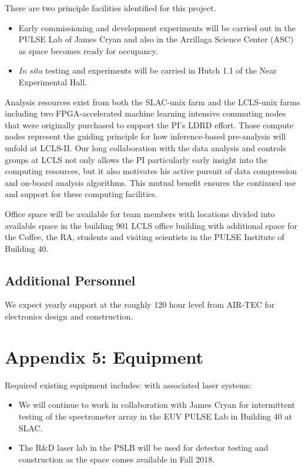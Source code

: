 There are two principle facilities identified for this project.
\begin{itemize}
\item Early commissioning and development experiments will be carried out in the PULSE Lab of James Cryan and also in the Arrillaga Science Center (ASC) as space becomes ready for occupancy.
\item \textit{In situ} testing and experiments will be carried in Hutch 1.1 of the Near Experimental Hall.
\end{itemize}

Analysis resources exist from both the SLAC-unix farm and the LCLS-unix farms including two FPGA-accelerated machine learning intensive commuting nodes that were originally purchased to support the PI's LDRD effort.  
Those compute nodes represent the guiding principle for how inference-based pre-analysis will unfold at LCLS-II.
Our long collaboration with the data analysis and controls groups at LCLS not only allows the PI particularly early insight into the computing resources, but it also motivates his active pursuit of data compression and on-board analysis algorithms.
This mutual benefit ensures the continued use and support for these computing facilities.

Office space will be available for team members with locations divided into available space in the building 901 LCLS office building with additional space for the Coffee, the RA, students and visiting scientists in the PULSE Institute of Building 40.

\subsection*{Additional Personnel}%

We expect yearly support at the roughly 120 hour level from AIR-TEC for electronics design and construction.

\clearpage
\appendix
\section*{Appendix 5: Equipment}

Required existing equipment includes:
\vspace{\baselineskip}
with associated laser systems: 
\begin{itemize}
\item We will continue to work in collaboration with James Cryan for intermittent testing of the spectrometer array in the EUV PULSE Lab in Building 40 at SLAC.
\item The R\&D laser lab in the PSLB will be used for detector testing and construction as the space comes available in Fall 2018.
\end{itemize}
\vspace{\baselineskip}

